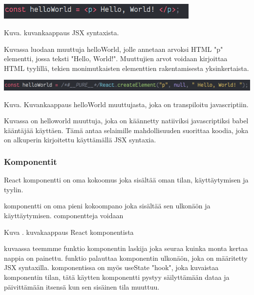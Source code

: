 \bigskip
\includegraphics[width=10cm]{src/public/oppar/pure_jsx_example.png}

Kuva\getImgCount .{} kuvankaappaus JSX syntaxista.
\medskip

Kuvassa luodaan muuttuja helloWorld, jolle annetaan arvoksi HTML "p"{} elementti, jossa teksti "Hello, World!"{}.
Muuttujien arvot voidaan kirjoittaa HTML tyylillä, tekien monimutkaisten elementtien rakentamisesta yksinkertaista.
\medskip



\bigskip
\includegraphics[width=15cm]{src/public/oppar/transpiled_jsx_example.png}

Kuva\getImgCount .{} Kuvankaappaus helloWorld muuttujasta, joka on transpiloitu javascriptiin. 
\medskip


Kuvassa on helloworld muuttuja, joka on käännetty natiiviksi javascriptiksi babel kääntäjää käyttäen.
Tämä antaa selaimille mahdollisuuden suorittaa koodia, joka on alkuperin kirjoitettu käyttämällä JSX syntaxia.
\medskip



\subsubsection{Komponentit}



React komponentti on oma kokoomus joka sisältää oman tilan, käyttäytymisen ja tyylin.

komponentti on oma pieni kokoompano joka sisältää sen ulkonäön ja käyttäytymisen. componentteja voidaan
\medskip
\bigskip

Kuva \getImgCount{}. kuvakaappaus React komponentista
\medskip

kuvaassa teemmme funktio komponentin laskija joka seuraa kuinka monta kertaa nappia on painettu.
funktio palauttaa komponentin ulkonäön, joka on määritetty JSX syntaxilla.
komponentissa on myös useState "hook"{}, joka kuvaistaa komponentin tilan, tätä käytten komponentti pystyy säilyttämään dataa ja päivittämään itsensä kun sen sisäinen tila muuttuu.
\medskip

